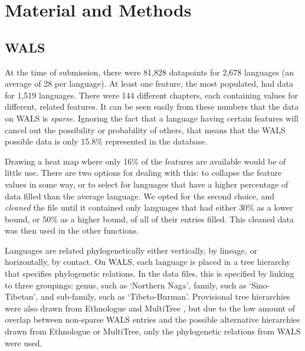 \documentclass[11pt]{article}
\begin{document}
\section{Material and Methods}
\subsection{WALS}
At the time of submission, there were 81,828 datapoints for 2,678 languages (an average of 28 per language). At least one feature, the most populated, had data for 1,519 languages. There were 144 different chapters, each containing values for different, related features. It can be seen easily from these numbers that the data on WALS is \emph{sparse}. Ignoring the fact that a language having certain features will cancel out the possibility or probability of others, that means that the WALS possible data is only 15.8\% represented in the database.

Drawing a heat map where only 16\% of the features are available would be of little use. There are two options for dealing with this: to collapse the feature values in some way, or to select for languages that have a higher percentage of data filled than the average language. We opted for the second choice, and \emph{cleaned}  the file until it contained only languages that had either 30\% as a lower bound, or 50\% as a higher bound, of all of their entries filled. This cleaned data was then used in the other functions.  

	

Languages are related phylogenetically either vertically, by lineage, or horizontally, by contact. On WALS, each language is placed in a tree hierarchy that specifies phylogenetic relations. In the data files, this is specified by linking to three groupings: genus, such as `Northern Naga', family, such as `Sino-Tibetan', and sub-family, such as `Tibeto-Burman'. Provisional tree hierarchies were also drawn from Ethnologue \cite{ethnologue} and MultiTree \cite{multitree}, but due to the low amount of overlap between non-sparse WALS entries and the possible alternative hierarchies drawn from Ethnologue or MultiTree, only the phylogenetic relations from WALS were used.
\end{document}
